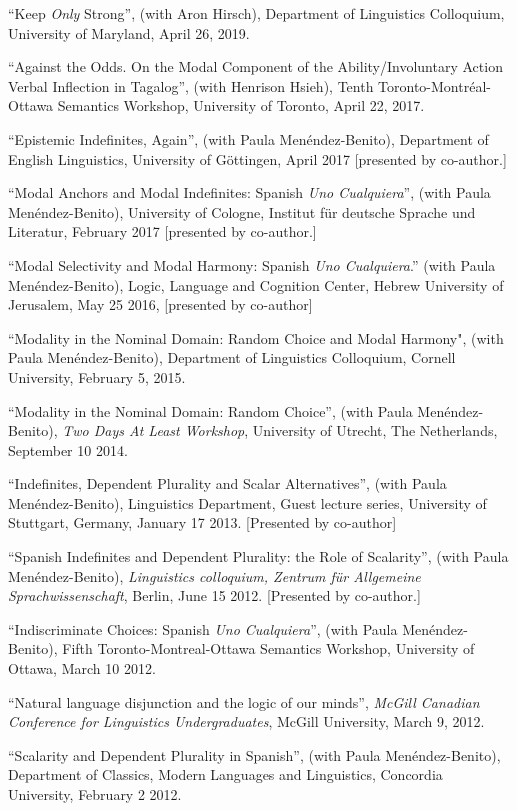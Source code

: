 \documentclass[11pt]{article}
\begin{document}
``Keep \textit{Only} Strong'', (with Aron Hirsch), Department of Linguistics Colloquium, University of Maryland, April 26, 2019.

``Against the Odds. On the Modal Component of the Ability/Involuntary Action Verbal Inflection in Tagalog'', (with Henrison Hsieh), Tenth Toronto-Montr\'eal-Ottawa Semantics Workshop, University of
Toronto, April 22, 2017.

``Epistemic Indefinites, Again'', (with Paula Men\'endez-Benito), Department of English Linguistics, University of G\"{o}ttingen, April 2017 [presented by co-author.]

``Modal Anchors and Modal Indefinites: Spanish \textit{Uno Cualquiera}'', (with Paula Men\'endez-Benito), University of Cologne, Institut f\"ur deutsche Sprache und Literatur, February 2017 [presented by co-author.]

``Modal Selectivity and Modal Harmony: Spanish \textit{Uno Cualquiera}.'' (with Paula Men\'endez-Benito), Logic, Language and Cognition Center, Hebrew University of Jerusalem, May 25 2016, [presented by co-author]

``Modality in the Nominal Domain: Random Choice and Modal Harmony", (with Paula Men\'endez-Benito), Department of Linguistics Colloquium, Cornell University, February 5, 2015.

``Modality in the Nominal Domain: Random Choice'',
(with Paula Men\'endez-Benito), \textit{Two Days At Least Workshop},
University of Utrecht, The Netherlands, September 10 2014.

``Indefinites, Dependent Plurality and Scalar
Alternatives'', (with Paula Men\'endez-Benito), Linguistics Department, Guest lecture series, University of Stuttgart, Germany, January 17 2013. [Presented by co-author]

``Spanish Indefinites and Dependent Plurality: the Role of
Scalarity'',  (with Paula Men\'endez-Benito), \textit{Linguistics colloquium, Zentrum f\"{u}r
  Allgemeine Sprachwissenschaft}, Berlin, June 15 2012. [Presented by co-author.]

``Indiscriminate Choices: Spanish \textit{Uno
  Cualquiera}'', (with Paula Men\'endez-Benito), Fifth Toronto-Montreal-Ottawa Semantics Workshop, University of
Ottawa, March 10 2012.

``Natural language disjunction and the logic of our
minds'', \textit{McGill Canadian Conference for Linguistics
  Undergraduates}, McGill University, March 9, 2012.

``Scalarity and Dependent Plurality in Spanish'', (with Paula Men\'endez-Benito),
Department of Classics, Modern Languages and Linguistics, Concordia
University, February 2 2012.
\end{document}
